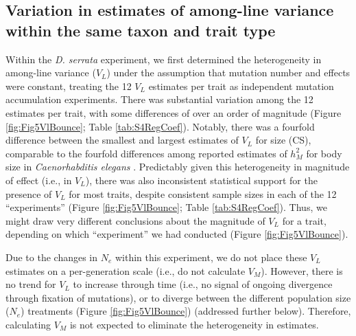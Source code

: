 \subsection{Variation in estimates of among-line variance within the same taxon and trait type}
Within the \textit{D. serrata} experiment, we first determined the heterogeneity in among-line variance ($V_L$) under the assumption that mutation number and effects were constant, treating the 12 $V_L$ estimates per trait as independent mutation accumulation experiments. There was substantial variation among the 12 estimates per trait, with some differences of over an order of magnitude (Figure \ref{fig:Fig5VlBounce}; Table \ref{tab:S4RegCoef}). Notably, there was a fourfold difference between the smallest and largest estimates of $V_L$ for size (CS), comparable to the fourfold differences among reported estimates of $h_M^2$ for body size in \textit{Caenorhabditis elegans} \citep{Azev02,Este05,Ostr07}. Predictably given this heterogeneity in magnitude of effect (i.e., in $V_L$), there was also inconsistent statistical support for the presence of $V_L$ for most traits, despite consistent sample sizes in each of the 12 “experiments” (Figure \ref{fig:Fig5VlBounce}; Table \ref{tab:S4RegCoef}). Thus, we might draw very different conclusions about the magnitude of $V_L$ for a trait, depending on which “experiment” we had conducted (Figure \ref{fig:Fig5VlBounce}). \par

Due to the changes in $N_e$ within this experiment, we do not place these $V_L$ estimates on a per-generation scale (i.e., do not calculate $V_M$). However, there is no trend for $V_L$ to increase through time (i.e., no signal of ongoing divergence through fixation of mutations), or to diverge between the different population size ($N_e$) treatments (Figure \ref{fig:Fig5VlBounce}) (addressed further below). Therefore, calculating $V_M$ is not expected to eliminate the heterogeneity in estimates.  \par

